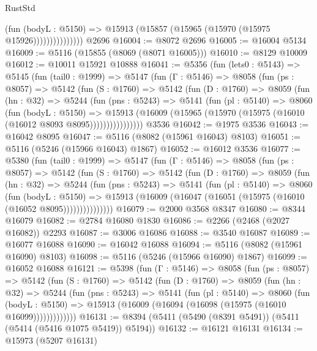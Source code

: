 \begin{lexlean}{RustStd}
\begin{coremodule}
                        (fun (bodyL : @5150) =>
                        @15913 (@15857 (@15965 (@15970 (@15975 @15926)))))))))))))))
    @2696
@16004 := @8072 @2696
@16005 := @16004 @5134
@16009 := @5116 (@15855 (@8069 (@8071 @16005)))
@16010 := @8129 @10009
@16012 := @10011 @15921 @10888
@16041 := @5356
    (fun (lets0 : @5143) =>
    @5145
      (fun (tail0 : @1999) =>
      @5147
        (fun (Γ : @5146) =>
        @8058
          (fun (ps : @8057) =>
          @5142
            (fun (S : @1760) =>
            @5142
              (fun (D : @1760) =>
              @8059
                (fun (hn : @32) =>
                @5244
                  (fun (pns : @5243) =>
                  @5141
                    (fun (pl : @5140) =>
                    @8060
                      (fun (bodyL : @5150) =>
                      @15913
                        (@16009 (@15965 (@15970 (@15975 (@16010 (@16012 @8093 @8095))))))))))))))))
    @3536
@16042 := @1975 @3536
@16043 := @16042 @8095
@16047 := @5116 (@8082 (@15961 @16043) @8103)
@16051 := @5116 (@5246 (@15966 @16043) @1867)
@16052 := @16012 @3536
@16077 := @5380
    (fun (tail0 : @1999) =>
    @5147
      (fun (Γ : @5146) =>
      @8058
        (fun (ps : @8057) =>
        @5142
          (fun (S : @1760) =>
          @5142
            (fun (D : @1760) =>
            @8059
              (fun (hn : @32) =>
              @5244
                (fun (pns : @5243) =>
                @5141
                  (fun (pl : @5140) =>
                  @8060
                    (fun (bodyL : @5150) =>
                    @15913 (@16009 (@16047 (@16051 (@15975 (@16010 (@16052 @8095)))))))))))))))
@16079 := @2000 @3568 @8347
@16080 := @8344 @16079
@16082 := @2784 @16080 @1830
@16086 := @2266 (@2468 (@2027 @16082)) @2293
@16087 := @3006 @16086
@16088 := @3540 @16087
@16089 := @16077 @16088
@16090 := @16042 @16088
@16094 := @5116 (@8082 (@15961 @16090) @8103)
@16098 := @5116 (@5246 (@15966 @16090) @1867)
@16099 := @16052 @16088
@16121 := @5398
    (fun (Γ : @5146) =>
    @8058
      (fun (ps : @8057) =>
      @5142
        (fun (S : @1760) =>
        @5142
          (fun (D : @1760) =>
          @8059
            (fun (hn : @32) =>
            @5244
              (fun (pns : @5243) =>
              @5141
                (fun (pl : @5140) =>
                @8060
                  (fun (bodyL : @5150) =>
                  @15913 (@16009 (@16094 (@16098 (@15975 (@16010 @16099)))))))))))))
@16131 := @8394 (@5411 (@5490 (@8391 @5491)) (@5411 (@5414 (@5416 @1075 @5419)) @5194))
@16132 := @16121 @16131
@16134 := @15973 (@5207 @16131)

\end{coremodule}
\end{lexlean}
